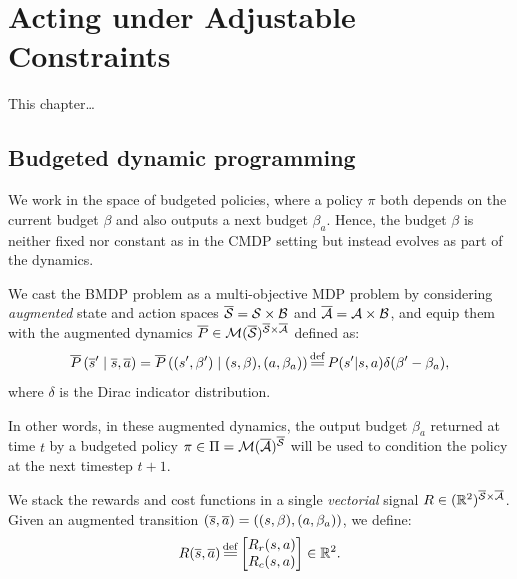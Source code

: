 
\graphicspath{{2-Chapters/5-Chapter/}}

\chapter{Acting under Adjustable Constraints}
\label{chapter:5}

\abstractStartChapter{}%
This chapter\dots
\minitocStartChapter{}

\section{Budgeted dynamic programming}
\label{sec:bdp}
We work in the space of budgeted policies, where a policy $\pi$ both depends on the current budget $\beta$ and also outputs a next budget $\beta_a$. Hence, the budget $\beta$ is neither fixed nor constant as in the CMDP setting but instead evolves as part of the dynamics.

We cast the BMDP problem as a multi-objective MDP problem \citep{Roijers2013ASO} by considering \emph{augmented} state and action spaces $\overline{\mathcal{S}} = \mathcal{S}\times \mathcal{B}$ and $\overline{\mathcal{A}}= \mathcal{A}\times \mathcal{B}$, and equip them with the augmented dynamics $\overline{P}\in \mathcal{M}(\overline{\mathcal{S}})^{\overline{\mathcal{S}} \times \overline{\mathcal{A}}}$ defined as:
\begin{equation}
\label{eq:dynamics}
\ov{P}\left(\os' \condbar \os, \oa\right) = \ov{P}\left((s',\beta') \condbar (s,\beta), (a, \beta_a)\right) \eqdef P(s'|s, a)\delta(\beta' - \beta_a),
\end{equation}
where $\delta$ is the Dirac indicator distribution.

In other words, in these augmented dynamics, the output budget $\beta_a$ returned at time $t$ by a budgeted policy $\pi\in \Pi=\mathcal{M}(\overline{\mathcal{A}})^{\overline{\mathcal{S}}}$ will be used to condition the policy at the next timestep $t+1$.

We stack the rewards and cost functions in a single \emph{vectorial} signal $R \in (\mathbb{R}^2)^{{\overline{\mathcal{S}} \times \overline{\mathcal{A}}}}$.
Given an augmented transition $(\overline{s}, \overline{a}) =((s,\beta), (a, \beta_a))$, we define:
\begin{equation}
R(\os, \oa) \eqdef  \begin{bmatrix}
R_r(s, a)\\
R_c(s, a)
\end{bmatrix}\in\Real^2.
\end{equation}


